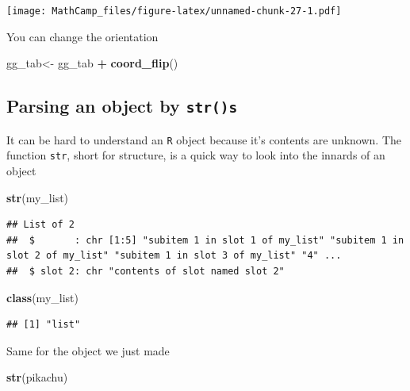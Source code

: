 \documentclass[
]{book}
\newenvironment{Shaded}{\begin{snugshade}}{\end{snugshade}}
\newcommand{\KeywordTok}[1]{\textcolor[rgb]{0.13,0.29,0.53}{\textbf{#1}}}
\newcommand{\NormalTok}[1]{#1}
\newcommand{\OperatorTok}[1]{\textcolor[rgb]{0.81,0.36,0.00}{\textbf{#1}}}
\newcommand{\StringTok}[1]{\textcolor[rgb]{0.31,0.60,0.02}{#1}}
\theoremstyle{definition}
\theoremstyle{definition}
\theoremstyle{definition}
\theoremstyle{definition}
\theoremstyle{remark}
\begin{document}
\texttt{[image: MathCamp\_files/figure-latex/unnamed-chunk-27-1.pdf]}

You can change the orientation

\begin{Shaded}
\begin{Highlighting}[]
\NormalTok{gg_tab<-}\StringTok{ }\NormalTok{gg_tab }\OperatorTok{+}\StringTok{ }\KeywordTok{coord_flip}\NormalTok{()}
\end{Highlighting}
\end{Shaded}

\hypertarget{parsing-an-object-by-strs}{%
\subsection{\texorpdfstring{Parsing an object by \texttt{str()s}}{Parsing an object by str()s}}\label{parsing-an-object-by-strs}}

It can be hard to understand an \texttt{R} object because it's contents are unknown. The function \texttt{str}, short for structure, is a quick way to look into the innards of an object

\begin{Shaded}
\begin{Highlighting}[]
\KeywordTok{str}\NormalTok{(my_list)}
\end{Highlighting}
\end{Shaded}

\begin{verbatim}
## List of 2
##  $       : chr [1:5] "subitem 1 in slot 1 of my_list" "subitem 1 in slot 2 of my_list" "subitem 1 in slot 3 of my_list" "4" ...
##  $ slot 2: chr "contents of slot named slot 2"
\end{verbatim}

\begin{Shaded}
\begin{Highlighting}[]
\KeywordTok{class}\NormalTok{(my_list)}
\end{Highlighting}
\end{Shaded}

\begin{verbatim}
## [1] "list"
\end{verbatim}

Same for the object we just made

\begin{Shaded}
\begin{Highlighting}[]
\KeywordTok{str}\NormalTok{(pikachu)}
\end{Highlighting}
\end{Shaded}
\end{document}
